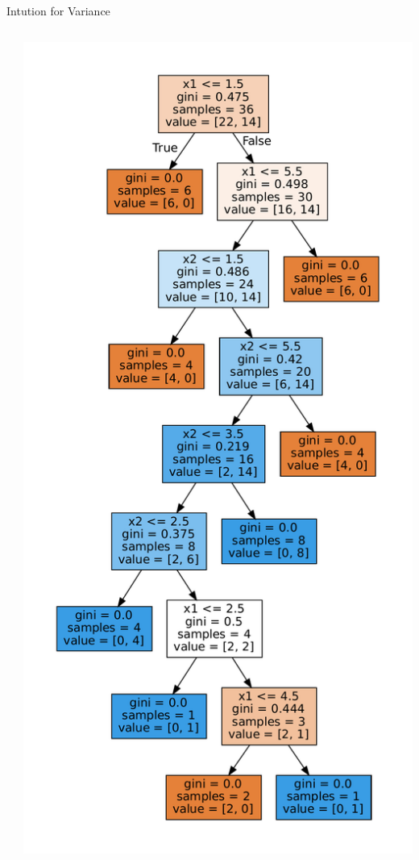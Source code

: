 \documentclass{beamer}
\begin{document}
\begin{frame}{Intution for Variance}
\begin{columns}
\begin{column}{0.5\textwidth}
\begin{center}
\end{center}
\end{column}
\begin{column}{0.5\textwidth}
\begin{center}
\includegraphics[scale=0.2]{../figures/decision-trees/bias-variance-full-depth-2-sklearn.pdf}
\end{center}
\end{column}
\end{columns}
\end{frame}
\end{document}
